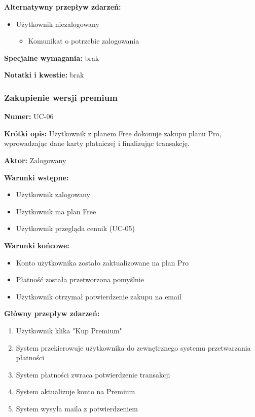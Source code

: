 \documentclass[12pt,a4paper]{article}
\begin{document}
\textbf{Alternatywny przepływ zdarzeń:}
\begin{itemize}[leftmargin=*]
    \item[4a] Użytkownik niezalogowany
    \begin{itemize}
    \item Komunikat o potrzebie zalogowania
\end{itemize}
\end{itemize}

\textbf{Specjalne wymagania:}
brak

\textbf{Notatki i kwestie:}
brak

\subsubsection{Zakupienie wersji premium}

\textbf{Numer:} UC-06

\textbf{Krótki opis:} Użytkownik z planem Free dokonuje zakupu planu Pro, wprowadzając dane karty płatniczej i finalizując transakcję.

\textbf{Aktor:} Zalogowany

\textbf{Warunki wstępne:}
\begin{itemize}[leftmargin=*]
    \item Użytkownik zalogowany
    \item Użytkownik ma plan Free
    \item Użytkownik przegląda cennik (UC-05)
\end{itemize}

\textbf{Warunki końcowe:}
\begin{itemize}[leftmargin=*]
    \item Konto użytkownika zostało zaktualizowane na plan Pro
    \item Płatność została przetworzona pomyślnie
    \item Użytkownik otrzymał potwierdzenie zakupu na email
\end{itemize}

\textbf{Główny przepływ zdarzeń:}
\begin{enumerate}[leftmargin=*]
    \item Użytkownik klika "Kup Premium"
    \item System przekierowuje użytkownika do zewnętrznego systemu przetwarzania płatności
    \item System płatności zwraca potwierdzenie transakcji
    \item System aktualizuje konto na Premium
    \item System wysyła maila z potwierdzeniem
\end{enumerate}
\end{document}
